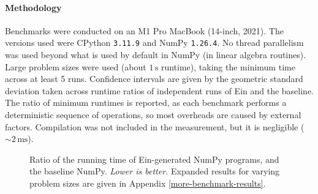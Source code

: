 \paragraph{Methodology} Benchmarks were conducted on an M1 Pro MacBook (14-inch, 2021). The versions used were CPython \texttt{3.11.9} and NumPy \texttt{1.26.4}. No thread parallelism was used beyond what is used by default in NumPy (in linear algebra routines). Large problem sizes were used (about $1\,\mathrm{s}$ runtime), taking the minimum time across at least 5 runs. Confidence intervals are given by the geometric standard deviation taken across runtime ratios of independent runs of Ein and the baseline. The ratio of minimum runtimes is reported, as each benchmark performs a deterministic sequence of operations, so most overheads are caused by external factors. Compilation was not included in the measurement, but it is negligible ($\sim 2\,\mathrm{ms}$).

\begin{figure}[b]
    \centering


    \caption{Ratio of the running time of Ein-generated NumPy programs, and the baseline NumPy. \textit{Lower is better.} Expanded results for varying problem sizes are given in Appendix \ref{more-benchmark-results}.}
    \label{fig:benchmark-results}
\end{figure}


